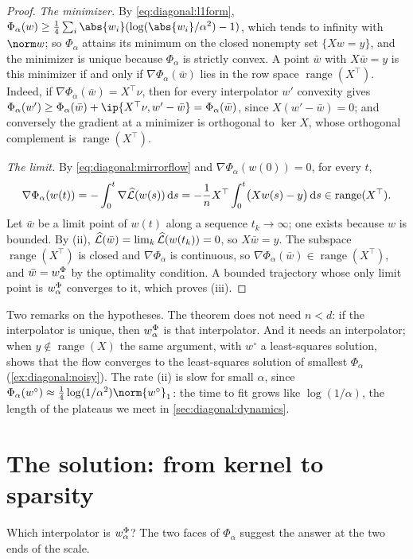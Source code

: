 \begin{refsection}
\begin{proof}
\emph{The minimizer.} By \eqref{eq:diagonal:l1form}, $\Phi_\alpha(w)\ge\frac14\sum_i\abs{w_i}(\log(\abs{w_i}/\alpha^2)-1)$, which tends to infinity with $\norm w$; so $\Phi_\alpha$ attains its minimum on the closed nonempty set $\{Xw=y\}$, and the minimizer is unique because $\Phi_\alpha$ is strictly convex. A point $\bar w$ with $X\bar w=y$ is this minimizer if and only if $\nabla\Phi_\alpha(\bar w)$ lies in the row space $\operatorname{range}(X^\top)$. Indeed, if $\nabla\Phi_\alpha(\bar w)=X^\top\nu$, then for every interpolator $w'$ convexity gives $\Phi_\alpha(w')\ge\Phi_\alpha(\bar w)+\ip{X^\top\nu,w'-\bar w}=\Phi_\alpha(\bar w)$, since $X(w'-\bar w)=0$; and conversely the gradient at a minimizer is orthogonal to $\ker X$, whose orthogonal complement is $\operatorname{range}(X^\top)$.

\emph{The limit.} By \eqref{eq:diagonal:mirrorflow} and $\nabla\Phi_\alpha(w(0))=0$,
for every $t$,
\[
  \nabla\Phi_\alpha(w(t))=-\int_0^t\nabla\widehat{\mathcal{L}}(w(s))\,\mathrm ds=-\frac1nX^\top\int_0^t\bigl(Xw(s)-y\bigr)\,\mathrm ds\in\operatorname{range}(X^\top).
\]
Let $\bar w$ be a limit point of $w(t)$ along a sequence $t_k\to\infty$; one exists because $w$ is bounded. By (ii), $\widehat{\mathcal{L}}(\bar w)=\lim_k\widehat{\mathcal{L}}(w(t_k))=0$, so $X\bar w=y$. The subspace $\operatorname{range}(X^\top)$ is closed and $\nabla\Phi_\alpha$ is continuous, so $\nabla\Phi_\alpha(\bar w)\in\operatorname{range}(X^\top)$, and $\bar w=w^\Phi_\alpha$ by the optimality condition. A bounded trajectory whose only limit point is $w^\Phi_\alpha$ converges to it, which proves (iii).
\end{proof}

Two remarks on the hypotheses. The theorem does not need $n<d$: if the interpolator is unique, then $w^\Phi_\alpha$ is that interpolator. And it needs an interpolator; when $y\notin\operatorname{range}(X)$ the same argument, with $w^\circ$ a least-squares solution, shows that the flow converges to the least-squares solution of smallest $\Phi_\alpha$ (\cref{ex:diagonal:noisy}). The rate (ii) is slow for small $\alpha$, since $\Phi_\alpha(w^\circ)\approx\frac14\log(1/\alpha^2)\norm{w^\circ}_1$: the time to fit grows like $\log(1/\alpha)$, the length of the plateaus we meet in \cref{sec:diagonal:dynamics}.

\section{The solution: from kernel to sparsity}\label{sec:diagonal:limits}

Which interpolator is $w^\Phi_\alpha$? The two faces of $\Phi_\alpha$ suggest the answer at the two ends of the scale.


\end{refsection}
